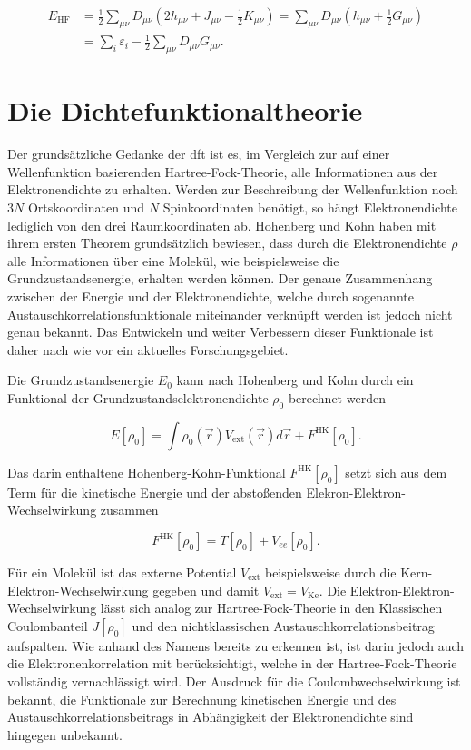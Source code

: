 \begin{equation}
\begin{aligned}
E_{\textrm{HF}}&=\frac{1}{2}\sum_{\mu\nu}D_{\mu\nu}(2h_{\mu\nu}+J_{\mu\nu}-\frac{1}{2} K_{\mu\nu})=\sum_{\mu\nu}D_{\mu\nu}(h_{\mu\nu}+\frac{1}{2}G_{\mu\nu})\\
&=\sum_i\varepsilon_i-\frac{1}{2}\sum_{\mu\nu}D_{\mu\nu}G_{\mu\nu}.
\end{aligned}
\label{hfenergie}
\end{equation}

\section{Die Dichtefunktionaltheorie}
Der grundsätzliche Gedanke der \ac{dft} ist es, im Vergleich zur auf einer Wellenfunktion basierenden Hartree-Fock-Theorie, alle Informationen aus der Elektronendichte zu erhalten. Werden zur Beschreibung der Wellenfunktion noch $3N$ Ortskoordinaten und $N$ Spinkoordinaten benötigt, so hängt Elektronendichte lediglich von den drei Raumkoordinaten ab. Hohenberg und Kohn\supercite{hohenberg1964inhomogeneous} haben mit ihrem ersten Theorem grundsätzlich bewiesen, dass durch die Elektronendichte $\rho$ alle Informationen über eine Molekül, wie beispielsweise die Grundzustandsenergie, erhalten werden können. Der genaue Zusammenhang zwischen der Energie und der Elektronendichte, welche durch sogenannte Austauschkorrelationsfunktionale miteinander verknüpft werden ist jedoch nicht genau bekannt. Das Entwickeln und weiter Verbessern dieser Funktionale ist daher nach wie vor ein aktuelles Forschungsgebiet.  

Die Grundzustandsenergie $E_0$ kann nach Hohenberg und Kohn durch ein Funktional der Grundzustandselektronendichte $\rho_0$ berechnet werden

\begin{equation}
	E[\rho_0]=\int\rho_0(\vec{r})V_{\textrm{ext}}(\vec{r})d\vec{r}+F^{\textrm{HK}}[\rho_0].
\end{equation}

Das darin enthaltene Hohenberg-Kohn-Funktional $F^{\textrm{HK}}[\rho_0]$ setzt sich aus dem Term für die kinetische Energie und der abstoßenden Elekron-Elektron-Wechselwirkung zusammen

\begin{equation}
	F^{\textrm{HK}}[\rho_0]=T[\rho_0]+V_{ee}[\rho_0].
\end{equation}

Für ein Molekül ist das externe Potential $V_{\textrm{ext}}$ beispielsweise durch die Kern-Elektron-Wechselwirkung gegeben und damit $V_{\textrm{ext}}=V_{\textrm{Ke}}$. Die Elektron-Elektron-Wechselwirkung lässt sich analog zur Hartree-Fock-Theorie in den Klassischen Coulombanteil $J[\rho_0]$ und den nichtklassischen Austauschkorrelationsbeitrag aufspalten. Wie anhand des Namens bereits zu erkennen ist, ist darin jedoch auch die Elektronenkorrelation mit berücksichtigt, welche in der Hartree-Fock-Theorie vollständig vernachlässigt wird. Der Ausdruck für die Coulombwechselwirkung ist bekannt, die Funktionale zur Berechnung kinetischen Energie und des Austauschkorrelationsbeitrags in Abhängigkeit der Elektronendichte sind hingegen unbekannt. 


